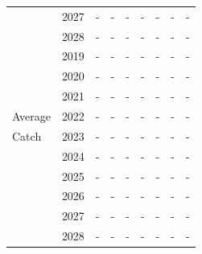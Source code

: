 \documentclass[12pt,]{article}
\begin{document}
\begin{table}[ht]
{\begin{tabular}{l|cc|>{\centering}p{.7in}c|>{\centering}p{.7in}c|>{\centering}p{.7in}c}
   & 2027 & - & - & - & - & - & - & - \\ 
   & 2028 & - & - & - & - & - & - & - \\ 
   \hline
 & 2019 & - & - & - & - & - & - & - \\ 
   & 2020 & - & - & - & - & - & - & - \\ 
   & 2021 & - & - & - & - & - & - & - \\ 
  Average & 2022 & - & - & - & - & - & - & - \\ 
  Catch & 2023 & - & - & - & - & - & - & - \\ 
   & 2024 & - & - & - & - & - & - & - \\ 
   & 2025 & - & - & - & - & - & - & - \\ 
   & 2026 & - & - & - & - & - & - & - \\ 
   & 2027 & - & - & - & - & - & - & - \\ 
   & 2028 & - & - & - & - & - & - & - \\ 
   \hline
\end{tabular}
}
\end{table}\begin{table}[ht]
\centering
\caption{Summary of 10-year projections 
                                                  beginning in 2016 for 
                                                  alternate states of nature based 
                                                  on an axis of uncertainty for the Southern model.  Columns range over low, 
                                                  mid, and high states of nature, and rows 
                                                  range over different assumptions of catch 
                                                  levels. An entry of "--" indicates that the 
                                                  stock is driven to very low abundance under the
                                                  particular scenario.} 
\label{tab:Decision_table_mod2}
\end{table}
\end{document}
